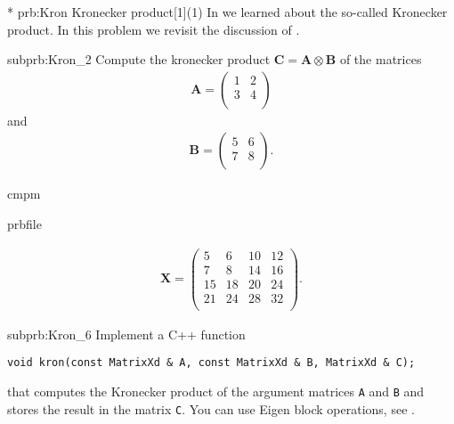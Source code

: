 \renewcommand{\ProblemName}{Kronecker}

\begin{samproblem}*
  {prb:Kron}
  {Kronecker product}[1](1)
  {
    In  we learned about the so-called Kronecker product.
    In this problem we revisit the
    discussion of .
  }

\begin{subproblem}{subprb:Kron_2}
  Compute the kronecker product
  $\mathbf{C} = \mathbf{A} \otimes \mathbf{B}$ of the matrices
\begin{align*}
  \mathbf{A} = \begin{pmatrix}
         1 & 2   \\
         3 & 4   \\
       \end{pmatrix}
\end{align*}
and
\begin{align*}
\mathbf{B}=\begin{pmatrix}
         5 & 6   \\
         7 & 8   \\
       \end{pmatrix}.
\end{align*}

\begin{samwriteprbpart}{cmpm}
  \begin{writeverbatim}{prbfile}
    \begin{samsolution}
      \begin{align*}
\mathbf{X}=\begin{pmatrix}
         5 & 6 & 10 & 12  \\
         7 & 8 & 14 & 16  \\
         15 & 18 & 20 & 24  \\
         21 & 24 & 28 & 32  \\
       \end{pmatrix}.
        \end{align*}
      \end{samsolution}
    \end{writeverbatim}
  \end{samwriteprbpart}
\end{subproblem}

\begin{subproblem}{subprb:Kron_6}
Implement a C++ function
\begin{lstlisting}[style=cppsimple]
void kron(const MatrixXd & A, const MatrixXd & B, MatrixXd & C);
\end{lstlisting}
that computes the Kronecker product of the argument matrices
\texttt{A} and \texttt{B} and stores the result in the matrix \texttt{C}.
You can use Eigen block operations, see .


\end{subproblem}
\end{samproblem}

